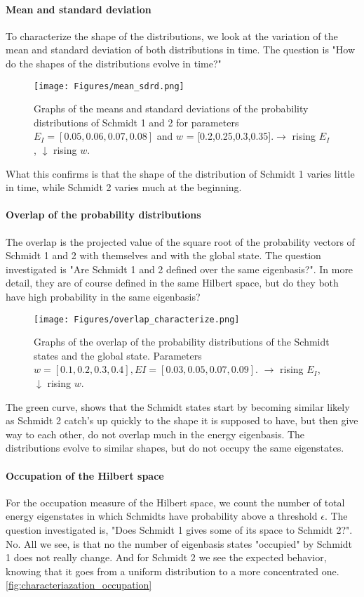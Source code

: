 \documentclass{article}
\begin{document}
\paragraph{Mean and standard deviation}
To characterize the shape of the distributions, we look at the variation of the mean and standard deviation of both distributions in time. The question is "How do the shapes of the distributions evolve in time?"
\begin{figure}[h]
    \centering
    \texttt{[image: Figures/mean\_sdrd.png]}
    \caption{Graphs of the means and standard deviations of the probability distributions of Schmidt 1 and 2 for parameters $E_I=[0.05,0.06,0.07,0.08]$ and $w$ = [0.2,0.25,0.3,0.35].$\rightarrow$ rising $E_I$, $\downarrow$ rising $w$.}
    \label{fig:characteriazation_mean_stdr}
\end{figure}

What this confirms is that the shape of the distribution of Schmidt 1 varies little in time, while Schmidt 2 varies much at the beginning.

\paragraph{Overlap of the probability distributions}
The overlap is the projected value of the square root of the probability vectors of Schmidt 1 and 2 with themselves and with the global state. The question investigated is "Are Schmidt 1 and 2 defined over the same eigenbasis?". In more detail, they are of course defined in the same Hilbert space, but do they both have high probability in the same eigenbasis? 
\begin{figure}[h]
    \centering
    \texttt{[image: Figures/overlap\_characterize.png]}
    \caption{Graphs of the overlap of the probability distributions of the Schmidt states and the global state. Parameters $w=[0.1,0.2,0.3,0.4], EI=[0.03,0.05,0.07,0.09]$. $\rightarrow$ rising $E_I$, $\downarrow$ rising $w$.}
    \label{fig:characteriazation_overlap}
\end{figure}
The green curve, shows that the Schmidt states start by becoming similar likely as Schmidt 2 catch's up quickly to the shape it is supposed to have, but then give way to each other, do not overlap much in the energy eigenbasis. {\color{teal} The distributions evolve to similar shapes, but do not occupy the same eigenstates.}


\paragraph{Occupation of the Hilbert space}
For the occupation measure of the Hilbert space, we count the number of total energy eigenstates in which Schmidts have probability above a threshold $\epsilon$. {\color{teal}The question investigated is, "Does Schmidt 1 gives some of its space to Schmidt 2?". No}. All we see, is that no the number of eigenbasis states "occupied" by Schmidt 1 does not really change. And for Schmidt 2 we see the expected behavior, knowing that it goes from a uniform distribution to a more concentrated one. \ref{fig:characteriazation_occupation}
\end{document}
